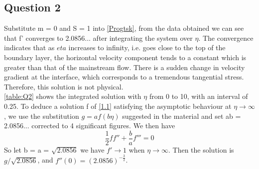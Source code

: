 \documentclass[a4paper,11pt]{article}
\begin{document}
\subsection{Question 2}
Substitute m = 0 and S = 1 into \ref{Progtsk}, from the data obtained we can see that
f' converges to 2.0856... after integrating the system over $\eta$. The convergence indicates that as $eta$ increases to infinity, i.e. goes close to the top of the boundary layer, the horizontal velocity component tends to a constant which is greater than that of the mainstream flow. There is a sudden change in velocity gradient at the interface, which corresponds to a tremendous tangential stress. Therefore, this solution is not physical. \\
\ref{table:Q2} shows the integrated solution with $\eta$ from 0 to 10, with an interval of 0.25. 
To deduce a solution f of \ref{1.1} satisfying the asymptotic behaviour at $\eta \to \infty$, we use the substitution $g = af(b\eta)$ suggested in the material and set ab = 2.0856... corrected to 4 significant figures. We then have 
\begin{equation*} 
\frac{1}{2}ff''+\frac{b}{a}f''' = 0
\end{equation*}
So let b = a = $\sqrt{2.0856}$ we have $f' \to 1$ when $\eta \to \infty$. Then the solution is $g/\sqrt{2.0856}$, and $ f''(0) = (2.0856)^{-\frac{3}{2}}$.
\end{document}
